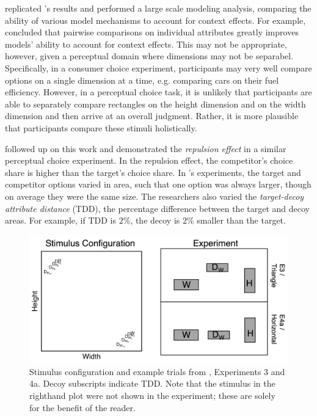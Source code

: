 \textcite{turnerCompetingTheoriesMultialternative2018a} replicated \textcite{trueblood2013not}'s results and performed a large scale modeling analysis, comparing the ability of various model mechanisms to account for context effects. For example, \textcite{turnerCompetingTheoriesMultialternative2018a} concluded that pairwise comparisons on individual attributes greatly improves models' ability to account for context effects. This may not be appropriate, however, given a perceptual domain where dimensions may not be separabel. Specifically, in a consumer choice experiment, participants may very well compare options on a single dimension at a time, e.g. comparing cars on their fuel efficiency. However, in a perceptual choice task, it is unlikely that participants are able to separately compare rectangles on the height dimension and on the width dimension and then arrive at an overall judgment. Rather, it is more plausible that participants compare these stimuli holistically.

\textcite{spektorWhenGoodLooks2018b} followed up on this work and demonstrated the \textit{repulsion effect} in a similar perceptual choice experiment. In the repulsion effect, the competitor's choice share is higher than the target's choice share. In \textcite{spektorWhenGoodLooks2018b}'s experiments, the target and competitor options varied in area, such that one option was always larger, though on average they were the same size. The researchers also varied the \textit{target-decoy attribute distance} (TDD), the percentage difference between the target and decoy areas. For example, if TDD is $2\%$, the decoy is $2\%$ smaller than the target. 

\begin{figure}
   \includegraphics[width=\linewidth]{figures/spektor_stim.png}
   \caption{Stimulus configuration and example trials from \textcite{spektorWhenGoodLooks2018b}, Experiments 3 and 4a. Decoy subscripts indicate TDD. Note that the stimulus in the righthand plot were not shown in the experiment; these are solely for the benefit of the reader.}
   \label{fig:spektor_stim}
\end{figure}

